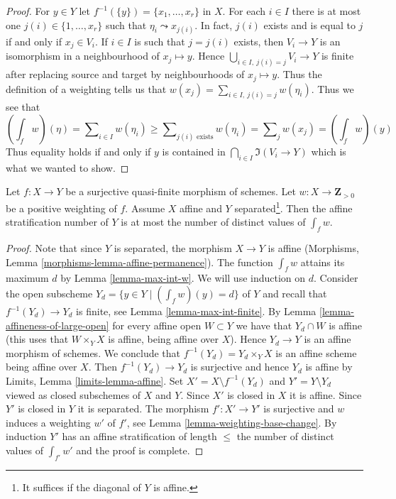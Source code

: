 \begin{proof}
\medskip\noindent
For $y \in Y$ let $f^{-1}(\{y\}) = \{x_1, \ldots, x_r\}$ in $X$.
For each $i \in I$ there is at most one $j(i) \in \{1, \ldots, x_r\}$
such that $\eta_i \leadsto x_{j(i)}$. In fact, $j(i)$ exists and is
equal to $j$ if and only if $x_j \in V_i$. If $i \in I$ is such that
$j = j(i)$ exists, then $V_i \to Y$ is an isomorphism in a neighbourhood
of $x_j \mapsto y$. Hence $\bigcup_{i \in I,\ j(i) = j} V_i \to Y$
is finite after replacing source and target by neighbourhoods of
$x_j \mapsto y$. Thus the definition of a weighting tells us that
$w(x_j) = \sum_{i \in I,\ j(i) = j} w(\eta_i)$.
Thus we see that
$$
(\textstyle{\int}_f w)(\eta) =
\sum\nolimits_{i \in I} w(\eta_i) \geq
\sum\nolimits_{j(i)\text{ exists}} w(\eta_i) =
\sum\nolimits_j w(x_j) = (\textstyle{\int}_f w)(y)
$$
Thus equality holds if and only if $y$ is contained in
$\bigcap_{i \in I} \Im(V_i \to Y)$ which is what we wanted to show.
\end{proof}

\begin{proposition}
\label{proposition-asn-weighting}
Let $f : X \to Y$ be a surjective quasi-finite morphism of schemes.
Let $w : X \to \mathbf{Z}_{> 0}$ be a positive weighting of $f$.
Assume $X$ affine and $Y$ separated\footnote{It suffices if the
diagonal of $Y$ is affine.}. Then the affine stratification
number of $Y$ is at most the number of distinct values of $\int_f w$.
\end{proposition}

\begin{proof}
Note that since $Y$ is separated, the morphism $X \to Y$ is affine
(Morphisms, Lemma \ref{morphisms-lemma-affine-permanence}).
The function $\int_f w$ attains its maximum $d$ by
Lemma \ref{lemma-max-int-w}. We will use induction on $d$.
Consider the open subscheme $Y_d = \{y \in Y \mid (\int_f w)(y) = d\}$
of $Y$ and recall that $f^{-1}(Y_d) \to Y_d$ is finite, see
Lemma \ref{lemma-max-int-finite}.
By Lemma \ref{lemma-affineness-of-large-open}
for every affine open $W \subset Y$ we have that $Y_d \cap W$ is affine
(this uses that $W \times_Y X$ is affine, being affine over $X$).
Hence $Y_d \to Y$ is an affine morphism of schemes. We
conclude that $f^{-1}(Y_d) = Y_d \times_Y X$ is
an affine scheme being affine over $X$.
Then $f^{-1}(Y_d) \to Y_d$ is surjective and
hence $Y_d$ is affine by Limits, Lemma \ref{limits-lemma-affine}.
Set $X' = X \setminus f^{-1}(Y_d)$ and $Y' = Y \setminus Y_d$
viewed as closed subschemes of $X$ and $Y$.
Since $X'$ is closed in $X$ it is affine. Since
$Y'$ is closed in $Y$ it is separated.
The morphism $f' : X' \to Y'$ is surjective and
$w$ induces a weighting $w'$ of $f'$, see
Lemma \ref{lemma-weighting-base-change}.
By induction $Y'$ has an affine stratification of
length $\leq$ the number of distinct values of
$\int_{f'} w'$ and the proof is complete.
\end{proof}









